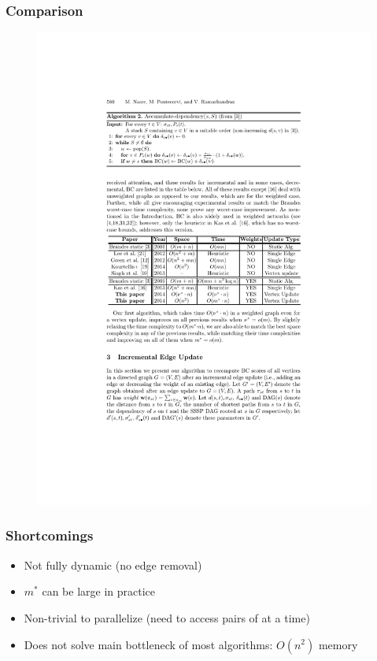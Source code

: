 \begin{frame}
  \frametitle{Comparison}

  \begin{figure}[H]
    \centering
    \includegraphics[width=\textwidth]{imgs/npr14-comparison}
  \end{figure}
  
\end{frame}

\begin{frame}
  \frametitle{Shortcomings}

  \begin{itemize}
    \item Not fully dynamic (no edge removal)
    \item $m^*$ can be large in practice
    \item Non-trivial to parallelize (need to access pairs of \sssp \dag at a time)
    \item Does not solve main bottleneck of most algorithms: $O(n^2)$ memory
  \end{itemize}
  
\end{frame}